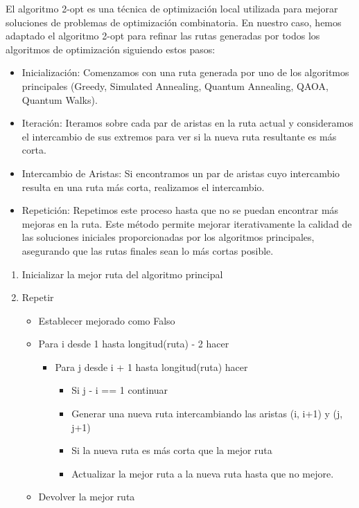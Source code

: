 \documentclass[11pt,a4paper,spanish]{book}
\begin{document}
El algoritmo 2-opt es una técnica de optimización local utilizada para mejorar soluciones de problemas de optimización combinatoria. En nuestro caso, hemos adaptado el algoritmo 2-opt para refinar las rutas generadas por todos los algoritmos de optimización siguiendo estos pasos:
\begin{itemize}
	\item Inicialización: Comenzamos con una ruta generada por uno de los algoritmos principales (Greedy, Simulated Annealing, Quantum Annealing, QAOA, Quantum Walks).
    \item Iteración: Iteramos sobre cada par de aristas en la ruta actual y consideramos el intercambio de sus extremos para ver si la nueva ruta resultante es más corta.
    \item Intercambio de Aristas: Si encontramos un par de aristas cuyo intercambio resulta en una ruta más corta, realizamos el intercambio.
    \item Repetición: Repetimos este proceso hasta que no se puedan encontrar más mejoras en la ruta.
Este método permite mejorar iterativamente la calidad de las soluciones iniciales proporcionadas por los algoritmos principales, asegurando que las rutas finales sean lo más cortas posible.
\end{itemize}

\begin{tcolorbox}[colback=white!95!blue, colframe=blue!50!black, title=Algoritmo 2-opt, fontupper=\ttfamily]
\begin{spacing}{0.9}
	\begin{enumerate}
		\item Inicializar la mejor ruta del algoritmo principal
		\item Repetir
		\begin{itemize}
			\item Establecer mejorado como Falso
			\item Para i desde 1 hasta longitud(ruta) - 2 hacer
			\begin{itemize}
				\item Para j desde i + 1 hasta longitud(ruta) hacer
				\begin{itemize}
					\item Si j - i == 1 continuar
					\item Generar una nueva ruta intercambiando las aristas (i, i+1) y (j, j+1)
					\item Si la nueva ruta es más corta que la mejor ruta
						\item Actualizar la mejor ruta a la nueva ruta hasta que no mejore.
				\end{itemize}
			\end{itemize}    
			\item Devolver la mejor ruta
		\end{itemize}
	\end{enumerate}
 \end{spacing}
\end{tcolorbox}
\end{document}
